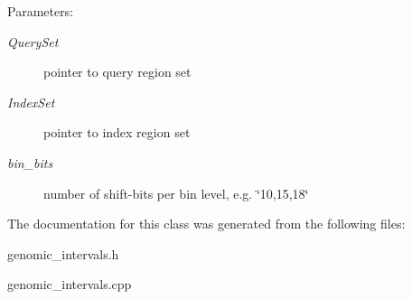 \begin{Desc}
\item[Parameters:]
\begin{description}
\item[{\em QuerySet}]pointer to query region set \item[{\em IndexSet}]pointer to index region set \item[{\em bin\_\-bits}]number of shift-bits per bin level, e.g. \char`\"{}10,15,18\char`\"{} \end{description}
\end{Desc}


The documentation for this class was generated from the following files:\begin{CompactItemize}
\item 
genomic\_\-intervals.h\item 
genomic\_\-intervals.cpp\end{CompactItemize}
